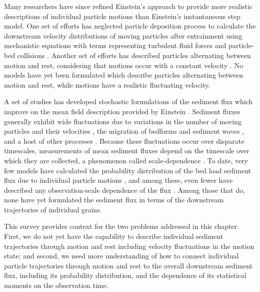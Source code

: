 Many researchers have since refined Einstein's approach to provide more realistic descriptions of individual particle motions than Einstein's instantaneous step model.
One set of efforts has neglected particle deposition process to calculate the downstream velocity distributions of moving particles after entrainment using mechanistic equations with terms representing turbulent fluid forces and particle-bed collisions \citep{Ancey2014,Fan2014}. 
Another set of efforts has described particles alternating between motion and rest, considering that motions occur with a constant velocity \citep{Lisle1998,Lajeunesse2017,Pierce2020b}. 
No models have yet been formulated which describe particles alternating between motion and rest, while motions have a realistic fluctuating velocity.

A set of studies has developed stochastic formulations of the sediment flux which improve on the mean field description provided by Einstein \citep{Furbish2012}. 
Sediment fluxes generally exhibit wide fluctuations due to variations in the number of moving particles and their velocities \citep{Bohm2005a,Ancey2006}, the migration of bedforms and sediment waves \citep{Guala2014,Recking2012}, and a host of other processes \citep{Dhont2018}.
Because these fluctuations occur over disparate timescales, measurements of mean sediment fluxes depend on the timescale over which they are collected, a phenomenon called scale-dependence \citep{Saletti2015,Dhont2018,Singh2009,Turowski2010,Ancey2020}.
To date, very few models have calculated the probability distribution of the bed load sediment flux due to individual particle motions \citep{Ancey2008,Ancey2014}, and among these, even fewer have described any observation-scale dependence of the flux \citep{Ancey2020,Turowski2010}. Among those that do, none have yet formulated the sediment flux in terms of the downstream trajectories of individual grains.

This survey provides context for the two problems addressed in this chapter. First, we do not yet have the capability to describe individual sediment trajectories through motion and rest including velocity fluctuations in the motion state; and second, we need more understanding of how to connect individual particle trajectories through motion and rest to the overall downstream sediment flux, including its probability distribution, and the dependence of its statistical moments on the observation time.

